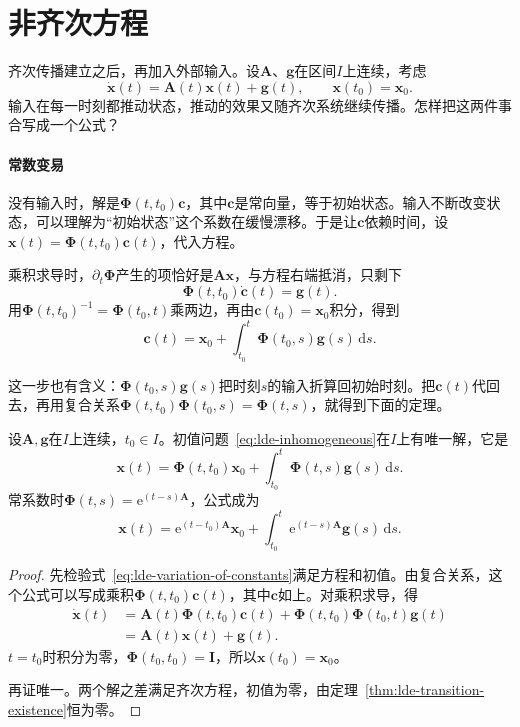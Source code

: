 \section{非齐次方程}
\label{sec:lde-inhomogeneous}

齐次传播建立之后，再加入外部输入。设$\bm{A}$、$\bm{g}$在区间$I$上连续，考虑
\begin{equation}
 \dot{\bm{x}}(t)=\bm{A}(t)\bm{x}(t)+\bm{g}(t),\qquad \bm{x}(t_0)=\bm{x}_0.
 \label{eq:lde-inhomogeneous}
\end{equation}
输入在每一时刻都推动状态，推动的效果又随齐次系统继续传播。怎样把这两件事合写成一个公式？

\paragraph{常数变易}
没有输入时，解是$\bm{\Phi}(t,t_0)\bm{c}$，其中$\bm{c}$是常向量，等于初始状态。输入不断改变状态，可以理解为“初始状态”这个系数在缓慢漂移。于是让$\bm{c}$依赖时间，设$\bm{x}(t)=\bm{\Phi}(t,t_0)\bm{c}(t)$，代入方程。

乘积求导时，$\partial_t\bm{\Phi}$产生的项恰好是$\bm{A}\bm{x}$，与方程右端抵消，只剩下
\[
 \bm{\Phi}(t,t_0)\dot{\bm{c}}(t)=\bm{g}(t).
\]
用$\bm{\Phi}(t,t_0)^{-1}=\bm{\Phi}(t_0,t)$乘两边，再由$\bm{c}(t_0)=\bm{x}_0$积分，得到
\[
 \bm{c}(t)=\bm{x}_0+\int_{t_0}^{t}\bm{\Phi}(t_0,s)\bm{g}(s)\,\mathrm{d}s.
\]

这一步也有含义：$\bm{\Phi}(t_0,s)\bm{g}(s)$把时刻$s$的输入折算回初始时刻。把$\bm{c}(t)$代回去，再用复合关系$\bm{\Phi}(t,t_0)\bm{\Phi}(t_0,s)=\bm{\Phi}(t,s)$，就得到下面的定理。

\begin{theorem}[常数变易公式]
\label{thm:lde-variation-of-constants}
设$\bm{A},\bm{g}$在$I$上连续，$t_0\in I$。初值问题~\eqref{eq:lde-inhomogeneous}在$I$上有唯一解，它是
\begin{equation}
 \bm{x}(t)=\bm{\Phi}(t,t_0)\bm{x}_0+\int_{t_0}^{t}\bm{\Phi}(t,s)\bm{g}(s)\,\mathrm{d}s.
 \label{eq:lde-variation-of-constants}
\end{equation}
常系数时$\bm{\Phi}(t,s)=\mathrm{e}^{(t-s)\bm{A}}$，公式成为
\begin{equation}
 \bm{x}(t)=\mathrm{e}^{(t-t_0)\bm{A}}\bm{x}_0+\int_{t_0}^{t}\mathrm{e}^{(t-s)\bm{A}}\bm{g}(s)\,\mathrm{d}s.
 \label{eq:lde-duhamel-constant}
\end{equation}
\end{theorem}

\begin{proof}
先检验式~\eqref{eq:lde-variation-of-constants}满足方程和初值。由复合关系，这个公式可以写成乘积$\bm{\Phi}(t,t_0)\bm{c}(t)$，其中$\bm{c}$如上。对乘积求导，得
\[
\begin{aligned}
 \dot{\bm{x}}(t)&=\bm{A}(t)\bm{\Phi}(t,t_0)\bm{c}(t)+\bm{\Phi}(t,t_0)\bm{\Phi}(t_0,t)\bm{g}(t)\\
 &=\bm{A}(t)\bm{x}(t)+\bm{g}(t).
\end{aligned}
\]
$t=t_0$时积分为零，$\bm{\Phi}(t_0,t_0)=\bm{I}$，所以$\bm{x}(t_0)=\bm{x}_0$。

再证唯一。两个解之差满足齐次方程，初值为零，由定理~\ref{thm:lde-transition-existence}恒为零。
\end{proof}

